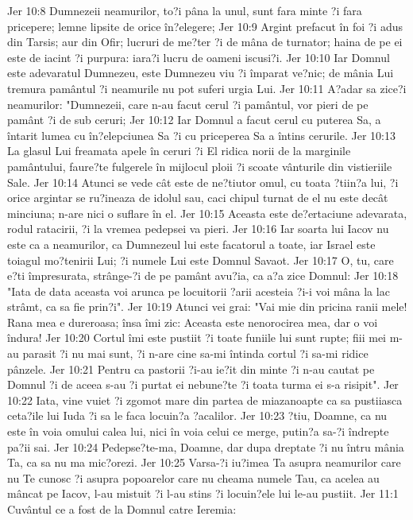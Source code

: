 Jer 10:8  Dumnezeii neamurilor, to?i pâna la unul, sunt fara minte ?i fara pricepere; lemne lipsite de orice în?elegere;
Jer 10:9  Argint prefacut în foi ?i adus din Tarsis; aur din Ofir; lucruri de me?ter ?i de mâna de turnator; haina de pe ei este de iacint ?i purpura: iara?i lucru de oameni iscusi?i.
Jer 10:10  Iar Domnul este adevaratul Dumnezeu, este Dumnezeu viu ?i împarat ve?nic; de mânia Lui tremura pamântul ?i neamurile nu pot suferi urgia Lui.
Jer 10:11  A?adar sa zice?i neamurilor: "Dumnezeii, care n-au facut cerul ?i pamântul, vor pieri de pe pamânt ?i de sub ceruri;
Jer 10:12  Iar Domnul a facut cerul cu puterea Sa, a întarit lumea cu în?elepciunea Sa ?i cu priceperea Sa a întins cerurile.
Jer 10:13  La glasul Lui freamata apele în ceruri ?i El ridica norii de la marginile pamântului, faure?te fulgerele în mijlocul ploii ?i scoate vânturile din vistieriile Sale.
Jer 10:14  Atunci se vede cât este de ne?tiutor omul, cu toata ?tiin?a lui, ?i orice argintar se ru?ineaza de idolul sau, caci chipul turnat de el nu este decât minciuna; n-are nici o suflare în el.
Jer 10:15  Aceasta este de?ertaciune adevarata, rodul ratacirii, ?i la vremea pedepsei va pieri.
Jer 10:16  Iar soarta lui Iacov nu este ca a neamurilor, ca Dumnezeul lui este facatorul a toate, iar Israel este toiagul mo?tenirii Lui; ?i numele Lui este Domnul Savaot.
Jer 10:17  O, tu, care e?ti împresurata, strânge-?i de pe pamânt avu?ia, ca a?a zice Domnul:
Jer 10:18  "Iata de data aceasta voi arunca pe locuitorii ?arii acesteia ?i-i voi mâna la lac strâmt, ca sa fie prin?i".
Jer 10:19  Atunci vei grai: "Vai mie din pricina ranii mele! Rana mea e dureroasa; însa îmi zic: Aceasta este nenorocirea mea, dar o voi îndura!
Jer 10:20  Cortul îmi este pustiit ?i toate funiile lui sunt rupte; fiii mei m-au parasit ?i nu mai sunt, ?i n-are cine sa-mi întinda cortul ?i sa-mi ridice pânzele.
Jer 10:21  Pentru ca pastorii ?i-au ie?it din minte ?i n-au cautat pe Domnul ?i de aceea s-au ?i purtat ei nebune?te ?i toata turma ei s-a risipit".
Jer 10:22  Iata, vine vuiet ?i zgomot mare din partea de miazanoapte ca sa pustiiasca ceta?ile lui Iuda ?i sa le faca locuin?a ?acalilor.
Jer 10:23  ?tiu, Doamne, ca nu este în voia omului calea lui, nici în voia celui ce merge, putin?a sa-?i îndrepte pa?ii sai.
Jer 10:24  Pedepse?te-ma, Doamne, dar dupa dreptate ?i nu întru mânia Ta, ca sa nu ma mic?orezi.
Jer 10:25  Varsa-?i iu?imea Ta asupra neamurilor care nu Te cunosc ?i asupra popoarelor care nu cheama numele Tau, ca acelea au mâncat pe Iacov, l-au mistuit ?i l-au stins ?i locuin?ele lui le-au pustiit.
Jer 11:1  Cuvântul ce a fost de la Domnul catre Ieremia:
